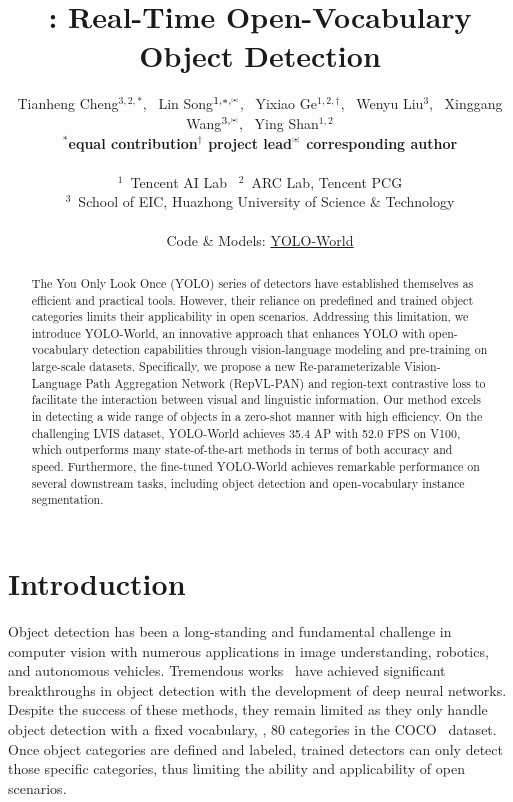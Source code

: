 \documentclass[10pt,twocolumn,letterpaper]{article}
\title{\name{}: Real-Time Open-Vocabulary Object Detection}
\author{
Tianheng Cheng$^{3,2,*}$,~
Lin Song$^{1,*,\text{\envelope}}$,~
Yixiao Ge$^{1,2,\dagger}$,~
Wenyu Liu$^{3}$,~
Xinggang Wang$^{3,\text{\envelope}}$,~
Ying Shan$^{1,2}$ \\
\textbf{\small $^*$equal contribution}\quad \textbf{\small $^\dagger$ project lead}\quad \textbf{\small $^\text{\envelope}$ corresponding author}\\~\\
$^1$~Tencent AI Lab~
$^2$~ARC Lab, Tencent PCG\\
$^3$~School of EIC, Huazhong University of Science \& Technology
\\~\\
Code \& Models: \href{https://github.com/AILab-CVC/YOLO-World}{YOLO-World}
}
\newcommand{\name}{YOLO-World}
\begin{document}
\maketitle

\begin{abstract}
The You Only Look Once (YOLO) series of detectors have established themselves as efficient and practical tools. However, their reliance on predefined and trained object categories limits their applicability in open scenarios. Addressing this limitation, we introduce \name{}, an innovative approach that enhances YOLO with open-vocabulary detection capabilities through vision-language modeling and pre-training on large-scale datasets. Specifically, we propose a new Re-parameterizable Vision-Language Path Aggregation Network (RepVL-PAN) and region-text contrastive loss to facilitate the interaction between visual and linguistic information. Our method excels in detecting a wide range of objects in a zero-shot manner with high efficiency. On the challenging LVIS dataset, \name{} achieves 35.4 AP with 52.0 FPS on V100, which outperforms many state-of-the-art methods in terms of both accuracy and speed. Furthermore, the fine-tuned \name{} achieves remarkable performance on several downstream tasks, including object detection and open-vocabulary instance segmentation.

\end{abstract}

% 

\section{Introduction}
\label{sec:intro}

Object detection has been a long-standing and fundamental challenge in computer vision with numerous applications in image understanding, robotics, and autonomous vehicles.
Tremendous works~\cite{ren2015faster,YOLOv1,FPN,MaskR-CNN} have achieved significant breakthroughs in object detection with the development of deep neural networks.
Despite the success of these methods, they remain limited as they only handle object detection with a fixed vocabulary, \eg, 80 categories in the COCO~\cite{COCO} dataset.
Once object categories are defined and labeled, trained detectors can only detect those specific categories, thus limiting the ability and applicability of open scenarios.
\end{document}
